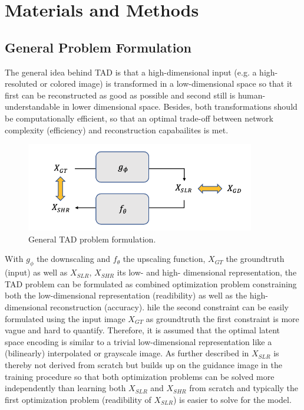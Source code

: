 \newpage
\section{Materials and Methods}
\label{sec:Approach}

\subsection{General Problem Formulation}
\label{sec:Approach_GPF}
The general idea behind \ac{TAD} is that a high-dimensional input (e.g. a
high-resoluted or colored image) is transformed in a low-dimensional space so
that it first can be reconstructed as good as possible and second still is
human-understandable in lower dimensional space. Besides, both transformations
should be computationally efficient, so that an optimal trade-off between
network complexity (efficiency) and reconstruction capabailites is met.

\begin{figure}[!htbp]
	\centering
	\includegraphics[width=10cm]{figures/problem}
	\caption{General \ac{TAD} problem formulation.}
  \label{fig:problem}
\end{figure}

With $g_\phi$ the downscaling and $f_\theta$ the upscaling function, $X_{GT}$
the groundtruth (input) as well as $X_{SLR}$, $X_{SHR}$ its low- and high-
dimensional representation, the \ac{TAD} problem can be formulated as combined
optimization problem constraining both the low-dimensional representation
(readibility) as well as the high-dimensional reconstruction (accuracy).
hile the second constraint can be easily formulated using the input image
$X_{GT}$ as groundtruth the first constraint is more vague and hard to quantify.
Therefore, it is assumed that the optimal latent space encoding
is similar to a trivial low-dimensional representation like a (bilinearly)
interpolated or grayscale image. As further described in
 $X_{SLR}$ is thereby not derived from scratch but
builds up on the guidance image in the training procedure so that both
optimization problems can be solved more independently than learning both
$X_{SLR}$ and $X_{SHR}$ from scratch and typically the first optimization
problem (readibility of $X_{SLR}$) is easier to solve for the model.

